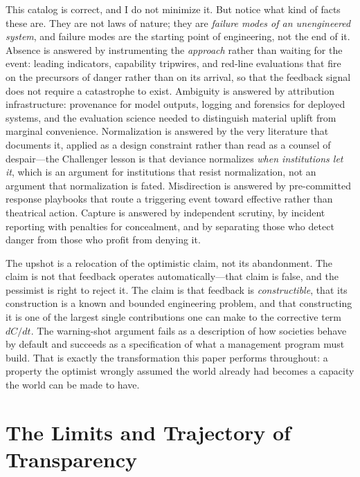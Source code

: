 \documentclass[11pt]{article}
\begin{document}
This catalog is correct, and I do not minimize it. But notice what kind of facts these are. They are not laws of nature; they are \emph{failure modes of an unengineered system}, and failure modes are the starting point of engineering, not the end of it. Absence is answered by instrumenting the \emph{approach} rather than waiting for the event: leading indicators, capability tripwires, and red-line evaluations that fire on the precursors of danger rather than on its arrival, so that the feedback signal does not require a catastrophe to exist. Ambiguity is answered by attribution infrastructure: provenance for model outputs, logging and forensics for deployed systems, and the evaluation science needed to distinguish material uplift from marginal convenience. Normalization is answered by the very literature that documents it, applied as a design constraint rather than read as a counsel of despair---the Challenger lesson is that deviance normalizes \emph{when institutions let it}, which is an argument for institutions that resist normalization, not an argument that normalization is fated. Misdirection is answered by pre-committed response playbooks that route a triggering event toward effective rather than theatrical action. Capture is answered by independent scrutiny, by incident reporting with penalties for concealment, and by separating those who detect danger from those who profit from denying it.

The upshot is a relocation of the optimistic claim, not its abandonment. The claim is not that feedback operates automatically---that claim is false, and the pessimist is right to reject it. The claim is that feedback is \emph{constructible}, that its construction is a known and bounded engineering problem, and that constructing it is one of the largest single contributions one can make to the corrective term $dC/dt$. The warning-shot argument fails as a description of how societies behave by default and succeeds as a specification of what a management program must build. That is exactly the transformation this paper performs throughout: a property the optimist wrongly assumed the world already had becomes a capacity the world can be made to have.

\section{The Limits and Trajectory of Transparency}
\label{sec:transparency}
\end{document}
